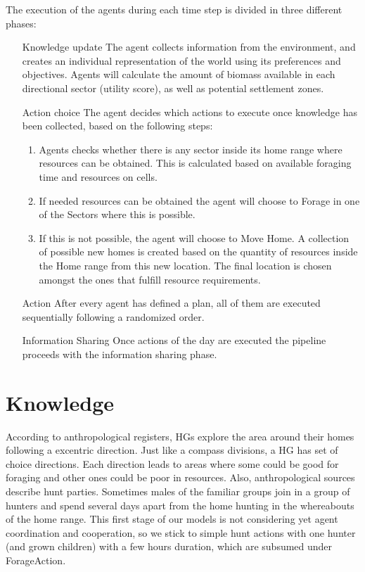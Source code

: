 \documentclass[11pt,oneside,a4paper,openright]{report}
\begin{document}
The execution of the agents during each time step is divided in three different phases:
\begin{enumerate}[1.]
	\item[Knowledge update]
	The agent collects information from the environment, and creates an individual representation of the
	world using its preferences and objectives. Agents will calculate the amount of biomass available in
	each directional sector (utility score), as well as potential settlement zones.
	\item[Action choice]
	The agent decides which actions to execute once knowledge has been collected, based on the
	following steps:
	\begin{enumerate}
		\item Agents checks whether there is any sector inside its home range where resources can be
		obtained. This is calculated based on available foraging time and resources on cells.
		\item If needed resources can be obtained the agent will choose to Forage in one of the Sectors
		where this is possible.
		\item If this is not possible, the agent will choose to Move Home. A collection of possible new homes
		is created based on the quantity of resources inside the Home range from this new location.
		The final location is chosen amongst the ones that fulfill resource requirements.
	\end{enumerate}
	\item[Action]
	After every agent has defined a plan, all of them are executed sequentially following a randomized
	order.
	\item[Information Sharing] 
	Once actions of the day are executed the pipeline proceeds with the information
	sharing phase.
\end{enumerate}


\section{Knowledge}

According to anthropological registers, HGs explore the area around their homes following a excentric direction. Just like a compass divisions, a HG has set of choice directions. Each direction leads to areas where some could be good for foraging and other ones could be poor in resources. Also, anthropological sources describe hunt parties. Sometimes males of the familiar groups join in a group of hunters and spend several days apart from the home hunting in the whereabouts of the home range. This first stage of our models is not considering yet agent coordination and cooperation, so we stick to simple hunt actions with one hunter (and grown children) with a few hours duration, which
are subsumed under ForageAction.
 
\end{document}
